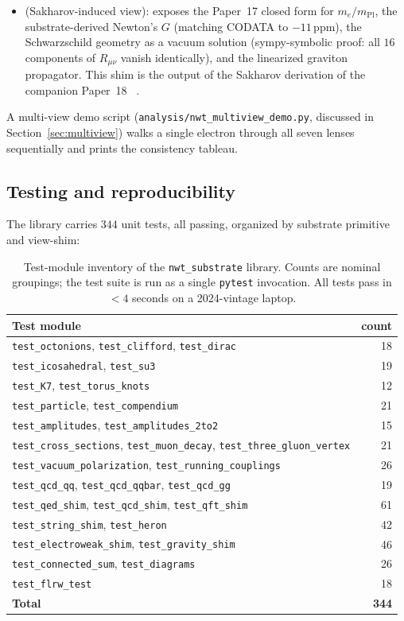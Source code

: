 \documentclass[11pt]{article}
\newcommand{\mPl}{m_{\mathrm{Pl}}}
\newcommand{\nwtsub}{\texttt{nwt\_substrate}}
\begin{document}
\begin{itemize}
\item[\texttt{gravity}] (Sakharov-induced view): exposes the
  Paper~17 closed form for $m_e/\mPl$, the substrate-derived
  Newton's $G$ (matching CODATA to $-11$\,ppm), the
  Schwarzschild geometry as a vacuum solution (sympy-symbolic
  proof: all $16$ components of $R_{\mu\nu}$ vanish identically),
  and the linearized graviton propagator.  This shim is the
  output of the Sakharov derivation of the companion Paper~18%
  ~\cite{paper18}.
\end{itemize}

A multi-view demo script (\texttt{analysis/nwt\_multiview\_demo.py},
discussed in Section~\ref{sec:multiview}) walks a single electron
through all seven lenses sequentially and prints the consistency
tableau.

\subsection{Testing and reproducibility}

The library carries $344$ unit tests, all passing, organized by
substrate primitive and view-shim:

\begin{table}[H]
\centering
\small
\begin{tabular}{lr}
\toprule
\textbf{Test module} & \textbf{count} \\
\midrule
\texttt{test\_octonions}, \texttt{test\_clifford}, \texttt{test\_dirac} & 18 \\
\texttt{test\_icosahedral}, \texttt{test\_su3} & 19 \\
\texttt{test\_K7}, \texttt{test\_torus\_knots} & 12 \\
\texttt{test\_particle}, \texttt{test\_compendium} & 21 \\
\texttt{test\_amplitudes}, \texttt{test\_amplitudes\_2to2} & 15 \\
\texttt{test\_cross\_sections}, \texttt{test\_muon\_decay},
  \texttt{test\_three\_gluon\_vertex} & 21 \\
\texttt{test\_vacuum\_polarization}, \texttt{test\_running\_couplings} & 26 \\
\texttt{test\_qcd\_qq}, \texttt{test\_qcd\_qqbar}, \texttt{test\_qcd\_gg} & 19 \\
\texttt{test\_qed\_shim}, \texttt{test\_qcd\_shim}, \texttt{test\_qft\_shim} & 61 \\
\texttt{test\_string\_shim}, \texttt{test\_heron} & 42 \\
\texttt{test\_electroweak\_shim}, \texttt{test\_gravity\_shim} & 46 \\
\texttt{test\_connected\_sum}, \texttt{test\_diagrams} & 26 \\
\texttt{test\_flrw\_test} & 18 \\
\midrule
\textbf{Total} & \textbf{344} \\
\bottomrule
\end{tabular}
\caption{Test-module inventory of the \nwtsub{} library.  Counts
are nominal groupings; the test suite is run as a single
\texttt{pytest} invocation.  All tests pass in
$<\!4$ seconds on a 2024-vintage laptop.}
\label{tab:test-inventory}
\end{table}
\end{document}
